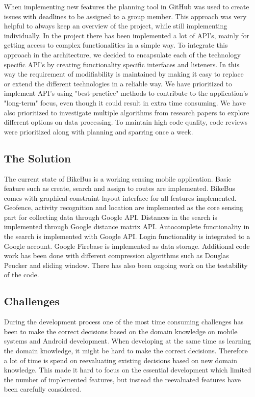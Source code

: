 When implementing new features the planning tool in GitHub was used to create issues with deadlines to be assigned to a group member. This approach was very helpful to always keep an overview of the project, while still implementing individually. In the project there has been implemented a lot of API's, mainly for getting access to complex functionalities in a simple way. To integrate this approach in the architecture, we decided to encapsulate each of the technology specific API's by creating functionality specific interfaces and listeners. In this way the requirement of modifiability is maintained by making it easy to replace or extend the different technologies in a reliable way. We have prioritized to implement API's using "best-practice" methods to contribute to the application's "long-term" focus, even though it could result in extra time consuming. We have also prioritized to investigate multiple algorithms from research papers to explore different options on data processing. To maintain high code quality, code reviews were prioritized along with planning and sparring once a week.

\subsection{The Solution}
The current state of BikeBus is a working sensing mobile application. Basic feature such as create, search and assign to routes are implemented. BikeBus comes with graphical constraint layout interface for all features implemented. Geofence, activity recognition and location are implemented as the core sensing part for collecting data through Google API. Distances in the search is implemented through Google distance matrix API. Autocomplete functionality in the search is implemented with Google API. Login functionality is integrated to a Google account. Google Firebase is implemented as data storage. Additional code work has been done with different compression algorithms such as Douglas Peucker and sliding window. There has also been ongoing work on the testability of the code.    

\subsection{Challenges}

During the development process one of the most time consuming challenges has been to make the correct decisions based on the domain knowledge on mobile systems and Android development. When developing at the same time as learning the domain knowledge, it might be hard to make the correct decisions. Therefore a lot of time is spend on reevaluating existing decisions based on new domain knowledge. This made it hard to focus on the essential development which limited the number of implemented features, but instead the reevaluated features have been carefully considered.

